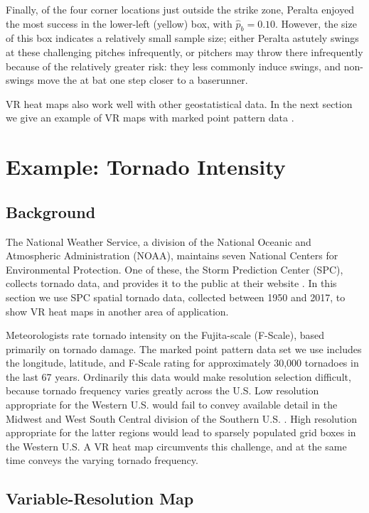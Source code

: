 Finally, of the four corner locations just outside the strike zone, Peralta enjoyed the most success in the lower-left (yellow) box, with $\hat{p}_{b} = 0.10$. However, the size of this box indicates a relatively small sample size; either Peralta astutely swings at these challenging pitches infrequently, or pitchers may throw there infrequently because of the relatively greater risk: they less commonly induce swings, and non-swings move the at bat one step closer to a baserunner. 

VR heat maps also work well with other geostatistical data. In the next section we give an example of VR maps with marked point pattern data \citep{Schabenberger2004}.

\section{Example: Tornado Intensity}

\subsection{Background}

The National Weather Service, a division of the National Oceanic and Atmospheric Administration (NOAA), maintains seven National Centers for Environmental Protection. One of these, the Storm Prediction Center (SPC), collects tornado data, and provides it to the public at their website \citep{NOAA}. In this section we use SPC spatial tornado data, collected between 1950 and 2017, to show VR heat maps in another area of application. 

Meteorologists rate tornado intensity on the Fujita-scale (F-Scale), based primarily on tornado damage. The marked point pattern data set we use includes the longitude, latitude, and F-Scale rating for approximately 30,000 tornadoes in the last 67 years. Ordinarily this data would make resolution selection difficult, because tornado frequency varies greatly across the U.S. Low resolution appropriate for the Western U.S. would fail to convey available detail in the Midwest and West South Central division of the Southern U.S. \citep{regions}. High resolution appropriate for the latter regions would lead to sparsely populated grid boxes in the Western U.S. A VR heat map circumvents this challenge, and at the same time conveys the varying tornado frequency. 

\subsection{Variable-Resolution Map}

